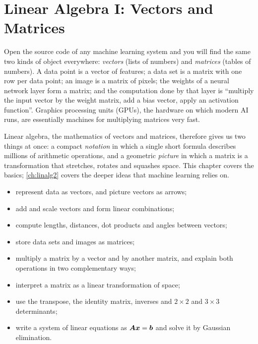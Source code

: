 \chapter{Linear Algebra I: Vectors and Matrices}\label{ch:linalg1}

\begin{motivation}
Open the source code of any machine learning system and you will find the
same two kinds of object everywhere: \emph{vectors} (lists of numbers) and
\emph{matrices} (tables of numbers). A data point is a vector of features; a
data set is a matrix with one row per data point; an image is a matrix of
pixels; the weights of a neural network layer form a matrix; and the
computation done by that layer is ``multiply the input vector by the weight
matrix, add a bias vector, apply an activation function''. Graphics processing
units (GPUs), the hardware on which modern AI runs, are essentially machines
for multiplying matrices very fast.

Linear algebra, the mathematics of vectors and matrices, therefore gives us
two things at once: a compact \emph{notation} in which a single short formula
describes millions of arithmetic operations, and a geometric \emph{picture} in
which a matrix is a transformation that stretches, rotates and squashes space.
This chapter covers the basics; \cref{ch:linalg2} covers the deeper ideas that
machine learning relies on.
\end{motivation}

\begin{objectives}
\begin{itemize}
  \item represent data as vectors, and picture vectors as arrows;
  \item add and scale vectors and form linear combinations;
  \item compute lengths, distances, dot products and angles between vectors;
  \item store data sets and images as matrices;
  \item multiply a matrix by a vector and by another matrix, and explain both
    operations in two complementary ways;
  \item interpret a matrix as a linear transformation of space;
  \item use the transpose, the identity matrix, inverses and $2\times2$ and
    $3 \times 3$ determinants;
  \item write a system of linear equations as $\bm{A}\bm{x} = \bm{b}$ and solve it by
    Gaussian elimination.
\end{itemize}
\end{objectives}

